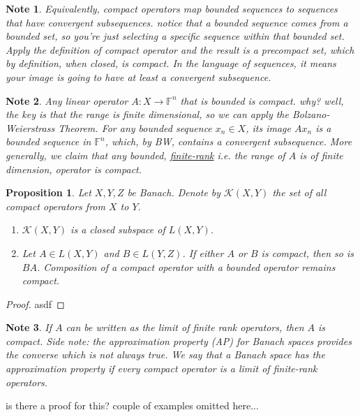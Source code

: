 \documentclass[letterpaper,twoside,11pt]{article}
\theoremstyle{mystyle}
\newtheorem{prop}{Proposition}[section]
\newtheorem*{note}{Note}
\newcommand{\cg}{\color{gray}}
\newcommand{\cbk}{\color{black}}
\newcommand{\cred}{\color{red}}
\newcommand{\cblu}{\color{blue}}
\begin{document}
\begin{note}
  Equivalently, compact operators map bounded sequences to sequences that have convergent subsequences. \cg notice that a bounded sequence comes from a bounded set, so you're just selecting a specific sequence within that bounded set. Apply the definition of compact operator and the result is a precompact set, which by definition, when closed, is compact. In the language of sequences, it means your image is going to have at least a convergent subsequence.\cbk 
\end{note}

\begin{note}
  Any linear operator $A:X\to \mathbb F^n$ that is bounded is compact. \cg why? well, the key is that the range is finite dimensional, so we can apply the Bolzano-Weierstrass Theorem. For any bounded sequence $x_n \in X$, its image $Ax_n$ is a bounded sequence in $\mathbb F^n$, which, by BW, contains a convergent subsequence. \cbk More generally, we claim that any bounded, \underline{finite-rank} \cg i.e. the range of $A$ is of finite dimension, \cbk operator is compact. 
\end{note}


\begin{prop}
  Let $X,Y,Z$ be Banach. Denote by $\mathcal K(X,Y)$ the set of all compact operators from $X$ to $Y$. 
  \begin{enumerate}
    \item $\mathcal K(X,Y)$ is a closed subspace of $L(X,Y)$.
    \item Let $A\in L(X,Y)$ and $B\in L(Y,Z)$. If either $A$ or $B$ is compact, then so is $BA$. \cg Composition of a compact operator with a bounded operator remains compact. \cbk
  \end{enumerate}
\end{prop}
\begin{proof}
  asdf
\end{proof}

\begin{note}
  If $A$ can be written as the limit of finite rank operators, then $A$ is compact. \cg Side note: the approximation property (AP) for Banach spaces provides the converse which is not always true. We say that a Banach space has the approximation property if every compact operator is a limit of finite-rank operators. 
\end{note}
\cred is there a proof for this? \cbk 
\cblu couple of examples omitted here...\cbk 
\end{document}
